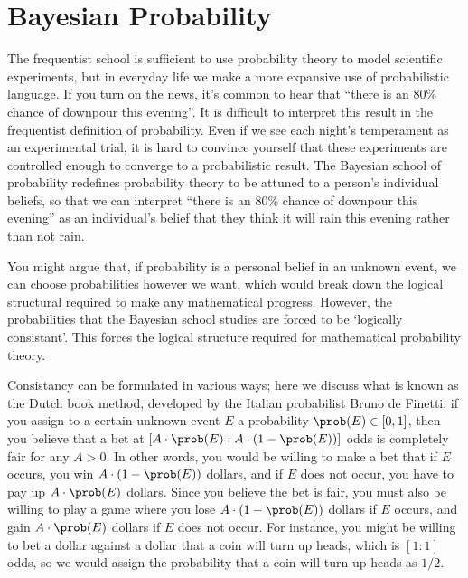 \section{Bayesian Probability}

The frequentist school is sufficient to use probability theory to model scientific experiments, but in everyday life we make a more expansive use of probabilistic language. If you turn on the news, it's common to hear that ``there is an 80\% chance of downpour this evening''. It is difficult to interpret this result in the frequentist definition of probability. Even if we see each night's temperament as an experimental trial, it is hard to convince yourself that these experiments are controlled enough to converge to a probabilistic result. The Bayesian school of probability redefines probability theory to be attuned to a person's individual beliefs, so that we can interpret ``there is an 80\% chance of downpour this evening'' as an individual's belief that they think it will rain this evening rather than not rain.

You might argue that, if probability is a personal belief in an unknown event, we can choose probabilities however we want, which would break down the logical structural required to make any mathematical progress. However, the probabilities that the Bayesian school studies are forced to be `logically consistant'. This forces the logical structure required for mathematical probability theory.

Consistancy can be formulated in various ways; here we discuss what is known as the Dutch book method, developed by the Italian probabilist Bruno de Finetti; if you assign to a certain unknown event $E$ a probability $\prob(E) \in [0,1]$, then you believe that a bet at $[A \cdot \prob(E) : A \cdot (1 - \prob(E))]$ odds is completely fair for any $A > 0$. In other words, you would be willing to make a bet that if $E$ occurs, you win $A \cdot (1 - \prob(E))$ dollars, and if $E$ does not occur, you have to pay up $A \cdot \prob(E)$ dollars. Since you believe the bet is fair, you must also be willing to play a game where you lose $A \cdot (1 - \prob(E))$ dollars if $E$ occurs, and gain $A \cdot \prob(E)$ dollars if $E$ does not occur. For instance, you might be willing to bet a dollar against a dollar that a coin will turn up heads, which is $[1:1]$ odds, so we would assign the probability that a coin will turn up heads as $1/2$.

